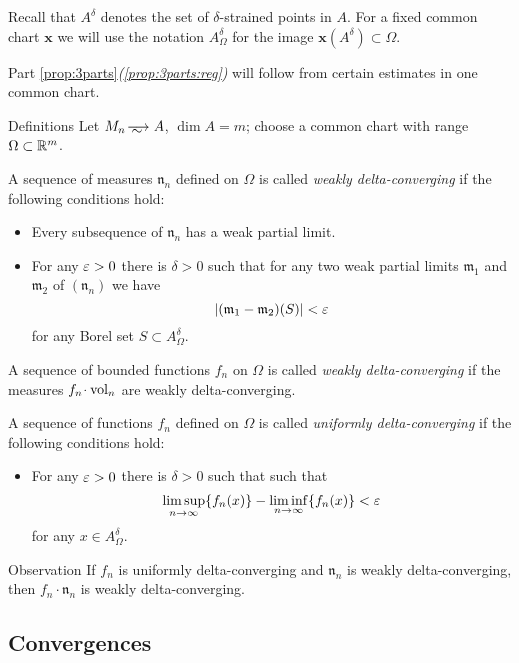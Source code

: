 Recall that $A^\delta$ denotes the set of $\delta$-strained points in $A$.
For a fixed common chart $\bm{x}$ we will use the notation $A^\delta_\Omega$ for the image $\bm{x}(A^\delta)\subset \Omega$.

Part \ref{prop:3parts}\textit{(\ref{prop:3parts:reg})} will follow from certain estimates in one common chart.

\begin{thm}{Definitions}\label{def:delta-converge}
Let $M_n\smooths{} A$, $\dim A=m$;
choose a common chart with range $\Omega\subset \mathbb{R}^m$.

A sequence of measures $\mathfrak n_n$ defined on $\Omega$ is called \emph{weakly delta-converging}
if the following conditions hold:
\begin{itemize}
 \item Every subsequence of $\mathfrak n_n$ has a weak partial limit.
 \item For any $\varepsilon>0$ there is $\delta>0$ such that for any two weak partial limits $\mathfrak m_1$ and $\mathfrak m_2$ of $(\mathfrak n_n)$ we have  
\[|(\mathfrak m_1-\mathfrak m_2)(S)|<\varepsilon\]
for any Borel set $S\subset A^\delta_\Omega$.
\end{itemize}
A sequence of bounded functions $f_n$ on $\Omega$ is called \emph{weakly delta-converging} if the measures $f_n\cdot \vol_n$ are weakly delta-converging.

A sequence of functions $f_n$ defined on $\Omega$ is called \emph{uniformly delta-converging}
if the following conditions hold:
\begin{itemize}
 \item For any $\varepsilon>0$ there is $\delta>0$ such that such that 
\[\limsup_{n\to\infty} \{f_n(x)\}-\liminf_{n\to\infty}\{f_n(x)\}<  \varepsilon\]
for any $x\in A^\delta_\Omega$.
\end{itemize}

\end{thm}

\begin{thm}{Observation}\label{obs:delta-weak-uniform}
If $f_n$ is uniformly delta-converging and $\mathfrak n_n$ is weakly delta-converging,
then $f_n\cdot \mathfrak n_n$ is weakly delta-converging.
\end{thm}

\subsection{Convergences}\label{sec:test-convergence}

